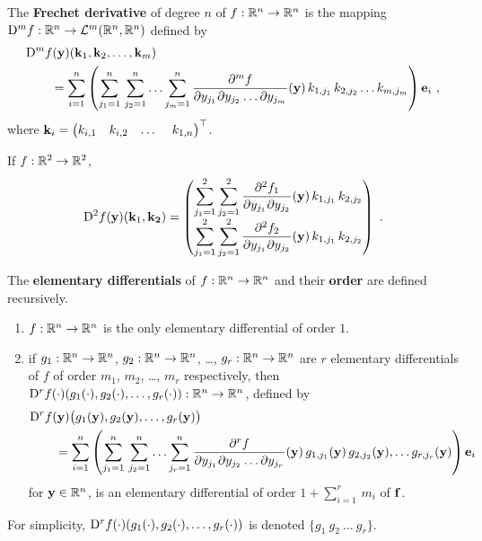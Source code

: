 \begin{defn}
The {\bfseries Frechet derivative}
of degree $n$ of $f:\RR^n \rightarrow \RR^n$ is the mapping
$\fdiff{f}{m} : \RR^n \to \LL^{m}(\RR^n,\RR^n)$ defined by
\begin{align*}
&\fdiff{f}{m}(\VEC{y})(\VEC{k}_1,\VEC{k}_2,\ldots,\VEC{k}_m) \\
& \qquad = \sum_{i=1}^n \left( \sum_{j_1=1}^n \, \sum_{j_2=1}^n \ldots
\sum_{j_m=1}^n \pdydxdots{f}{y_{j_1}}{y_{j_2}}{y_{j_m}}{m}{}{}{}
(\VEC{y}) \, k_{1,j_1}\,k_{2,j_2}\ldots k_{m,j_m}  \right) \VEC{e}_i\ ,
\end{align*}
where $\VEC{k}_i = \begin{pmatrix}
k_{i,1} & k_{i,2} & \ldots&\ k_{1,n} \end{pmatrix}^\top$.
\end{defn}

\begin{egg}
If $f:\RR^2 \rightarrow \RR^2$,
\[
\fdiff{f}{2}(\VEC{y})(\VEC{k}_1, \VEC{k_2}) =
\begin{pmatrix}
\displaystyle
\sum_{j_1=1}^2 \sum_{j_2=1}^2 \pdydxnm{f_1}{y_{j_1}}{y_{j_2}}{2}{}{}(\VEC{y})
\, k_{1,j_1}\,k_{2,j_2} \\[1em]
\displaystyle
\sum_{j_1=1}^2 \sum_{j_2=1}^2 \pdydxnm{f_2}{y_{j_1}}{y_{j_2}}{2}{}{}(\VEC{y})
\, k_{1,j_1}\,k_{2,j_2}
\end{pmatrix} \ .
\]
\end{egg}

\begin{defn}
The
{\bfseries elementary differentials}
of $f:\RR^n \rightarrow \RR^n$ and their
{\bfseries order}
are defined recursively.
\begin{enumerate}
\item $f:\RR^n \rightarrow \RR^n$ is the only elementary
differential of order $1$.
\item if $g_1:\RR^n\rightarrow \RR^n$,
$g_2:\RR^n\rightarrow \RR^n$, \ldots,
$g_r:\RR^n\rightarrow \RR^n$
are $r$ elementary differentials of $f$ of order $m_1$, $m_2$,
\ldots, $m_r$ respectively, then 
$\fdiff{f}{r}(\cdot)(g_1(\cdot),g_2(\cdot), \ldots,g_r(\cdot))
:\RR^n\rightarrow \RR^n$,
defined by
\begin{align*}
&\fdiff{f}{r}(\VEC{y})\big(g_1(\VEC{y}),g_2(\VEC{y}),\ldots,g_r(\VEC{y})\big) \\
& \qquad = \sum_{i=1}^n \left( \sum_{j_1=1}^n \, \sum_{j_2=1}^n \ldots
\sum_{j_r=1}^n \pdydxdots{f}{y_{j_1}}{y_{j_2}}{y_{j_r}}{r}{}{}{}
(\VEC{y}) \, g_{1,j_1}(\VEC{y})\,g_{2,j_2}(\VEC{y}), \ldots
g_{r,j_r}(\VEC{y})  \right) \VEC{e}_i
\end{align*}
for $\VEC{y} \in \RR^n$, is an elementary differential of order
$\displaystyle 1 +\sum_{i=1}^r\,m_i$ of $\VEC{f}$.
\end{enumerate}
For simplicity, $\fdiff{f}{r}(\cdot)(g_1(\cdot),g_2(\cdot),\ldots,g_r(\cdot))$
is denoted $\{g_1\ g_2\ \ldots\ g_r\}$.
\end{defn}

